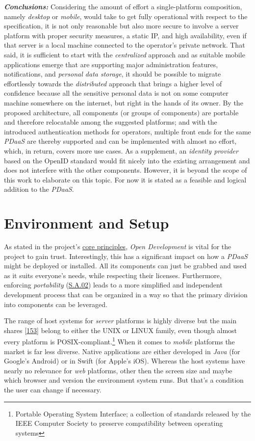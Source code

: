 \documentclass[12pt,english,a4paper,titlepage,cleardoublepage=empty,dottedtoc]{report}
\begin{document}
\emph{\textbf{Conclusions:}} Considering the amount of effort a
single-platform composition, namely \emph{desktop} or \emph{mobile},
would take to get fully operational with respect to the specification,
it is not only reasonable but also more secure to involve a server
platform with proper security measures, a static IP, and high
availability, even if that server is a local machine connected to the
operator's private network. That said, it is sufficient to start with
the \emph{centralized} approach and as suitable mobile applications
emerge that are supporting major administration features, notifications,
and \emph{personal data storage}, it should be possible to migrate
effortlessly towards the \emph{distributed} approach that brings a
higher level of confidence because all the sensitive personal data is
not on some computer machine somewhere on the internet, but right in the
hands of its owner. By the proposed architecture, all components (or
groups of components) are portable and therefore relocatable among the
suggested platforms; and with the introduced authentication methods for
operators, multiple front ends for the same \emph{PDaaS} are thereby
supported and can be implemented with almost no effort, which, in
return, covers more use cases. As a supplement, an \emph{identity
provider} based on the OpenID standard would fit nicely into the
existing arrangement and does not interfere with the other components.
However, it is beyond the scope of this work to elaborate on this topic.
For now it is stated as a feasible and logical addition to the
\emph{PDaaS}.

\section{Environment and Setup}\label{environment-and-setup}

As stated in the project's \protect\hyperlink{core-principles}{core
principles}, \emph{Open Development} is vital for the project to gain
trust. Interestingly, this has a significant impact on how a
\emph{PDaaS} might be deployed or installed. All its components can just
be grabbed and used as it suits everyone's needs, while respecting their
licenses. Furthermore, enforcing \emph{portability}
(\protect\hyperlink{sa02}{S.A.02}) leads to a more simplified and
independent development process that can be organized in a way so that
the primary division into components can be leveraged.

The range of host systems for \emph{server} platforms is highly diverse
but the main shares
{[}\protect\hyperlink{ref-web_2017_wikipedia_os-market-share}{153}{]}
belong to either the UNIX or LINUX family, even though almost every
platform is POSIX-compliant.\footnote{Portable Operating System
  Interface; a collection of standards released by the IEEE Computer
  Society to preserve compatibility between operating systems} When it
comes to \emph{mobile} platforms the market is far less diverse. Native
applications are either developed in \emph{Java} (for Google's Android)
or in Swift (for Apple's iOS). Whereas the host systems have nearly no
relevance for \emph{web} platforms, other then the screen size and maybe
which browser and version the environment system runs. But that's a
condition the user can change if necessary.
\end{document}
